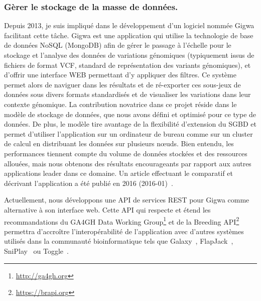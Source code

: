 \subsubsection*{Gèrer le stockage de la masse de données.}

Depuis 2013, je suis impliqué dans le développement d’un logiciel nommée Gigwa facilitant cette tâche. Gigwa est une application qui utilise la technologie de base de données NoSQL (MongoDB) afin de gérer le passage à l’échelle pour le stockage et l’analyse des données de variations génomiques (typiquement issus de fichiers de format VCF, standard de représentation des variants génomiques), et d’offrir une interface WEB permettant d’y appliquer des filtres. Ce système permet alors de naviguer dans les résultats et de ré-exporter ces sous-jeux de données sous divers formats standardisés et de visualiser les variations dans leur contexte génomique. La contribution novatrice dans ce projet réside dans le modèle de stockage de données, que nous avons défini et optimisé pour ce type de données. De plus, le modèle tire avantage de la flexibilité d’extension du SGBD et permet d’utiliser l’application sur un ordinateur de bureau comme sur un cluster de calcul en distribuant les données sur plusieurs nœuds. Bien entendu, les performances tiennent compte du volume de données stockées et des ressources allouées, mais nous obtenons des résultats encourageants par rapport aux autres applications leader dans ce domaine. Un article effectuant le comparatif et décrivant l'application a été publié en 2016 (2016-01)~\cite{Sempere2016}.

Actuellement, nous développons une API de services REST pour Gigwa comme alternative à son interface web. Cette API qui respecte et étend les recommandations du GA4GH Data Working Group\footnote{\url{http://ga4gh.org}} et de la Breeding API\footnote{\url{https://brapi.org}} permettra d’accroître l’interopérabilité de l’application avec d’autres systèmes utilisés dans la communauté bioinformatique tels que Galaxy~\cite{Giardine2005,Goecks2010}, FlapJack~\cite{Milne2010}, SniPlay~\cite{Dereeper2015} ou Toggle~\cite{Monat2015}.


